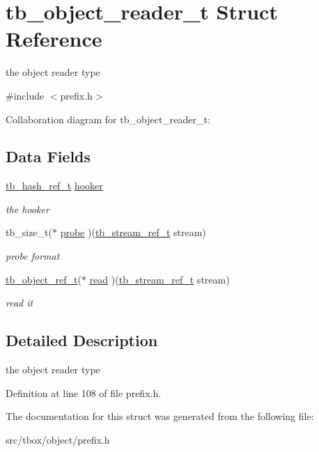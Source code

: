 \hypertarget{structtb__object__reader__t}{\section{tb\-\_\-object\-\_\-reader\-\_\-t Struct Reference}
\label{structtb__object__reader__t}
}


the object reader type  




{\ttfamily \#include $<$prefix.\-h$>$}



Collaboration diagram for tb\-\_\-object\-\_\-reader\-\_\-t\-:
\subsection*{Data Fields}
\begin{DoxyCompactItemize}
\item 
\hypertarget{structtb__object__reader__t_a52a4a5b4fa1e301c69ba2d2a2439bddf}{\hyperlink{structtb__iterator__t}{tb\-\_\-hash\-\_\-ref\-\_\-t} \hyperlink{structtb__object__reader__t_a52a4a5b4fa1e301c69ba2d2a2439bddf}{hooker}}\label{structtb__object__reader__t_a52a4a5b4fa1e301c69ba2d2a2439bddf}

\begin{DoxyCompactList}\small\item\em the hooker \end{DoxyCompactList}\item 
\hypertarget{structtb__object__reader__t_af3a7f8a7ca8ab12cf3d91692f5d89538}{tb\-\_\-size\-\_\-t($\ast$ \hyperlink{structtb__object__reader__t_af3a7f8a7ca8ab12cf3d91692f5d89538}{probe} )(\hyperlink{structtb__stream__ref__t}{tb\-\_\-stream\-\_\-ref\-\_\-t} stream)}\label{structtb__object__reader__t_af3a7f8a7ca8ab12cf3d91692f5d89538}

\begin{DoxyCompactList}\small\item\em probe format \end{DoxyCompactList}\item 
\hypertarget{structtb__object__reader__t_a05225e3cee05f50f8969834a1bdbac75}{\hyperlink{structtb__object__t}{tb\-\_\-object\-\_\-ref\-\_\-t}($\ast$ \hyperlink{structtb__object__reader__t_a05225e3cee05f50f8969834a1bdbac75}{read} )(\hyperlink{structtb__stream__ref__t}{tb\-\_\-stream\-\_\-ref\-\_\-t} stream)}\label{structtb__object__reader__t_a05225e3cee05f50f8969834a1bdbac75}

\begin{DoxyCompactList}\small\item\em read it \end{DoxyCompactList}\end{DoxyCompactItemize}


\subsection{Detailed Description}
the object reader type 

Definition at line 108 of file prefix.\-h.



The documentation for this struct was generated from the following file\-:\begin{DoxyCompactItemize}
\item 
src/tbox/object/prefix.\-h\end{DoxyCompactItemize}
